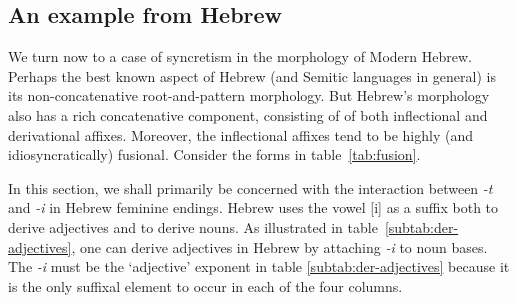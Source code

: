 \subsection{An example from Hebrew}
\label{sec:heb-example}
We turn now to a case of syncretism in the morphology of Modern Hebrew. Perhaps
the best known aspect of Hebrew (and Semitic languages in general) is its 
non-concatenative root-and-pattern morphology. But 
Hebrew's morphology also has a rich concatenative component, consisting of
of both inflectional and derivational affixes. Moreover, the inflectional affixes tend to be
highly (and idiosyncratically) fusional.  
Consider the forms in table~\ref{tab:fusion}. 

In this section, we shall primarily be concerned with the
interaction between \textit{-t} and \textit{-i} in Hebrew feminine endings.
Hebrew uses the vowel [i] 
as a suffix both to derive adjectives and to derive nouns.
As illustrated in table~\ref{subtab:der-adjectives}, 
one can derive adjectives 
in Hebrew by attaching \textit{-i} to noun bases. The \textit{-i} 
must be the `adjective' exponent
in table \ref{subtab:der-adjectives} because it is the only suffixal 
element to occur in each
of the four columns. %
